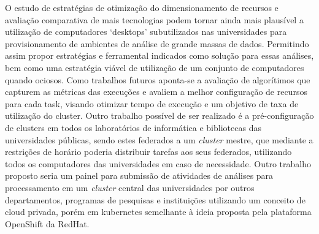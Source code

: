 O estudo de estratégias de otimização do dimensionamento de recursos e avaliação comparativa de mais tecnologias podem tornar ainda mais plausível a utilização de computadores ‘desktops’ subutilizados nas universidades para provisionamento de ambientes de análise de grande massas de dados. Permitindo assim propor estratégias e ferramental indicados como solução para essas análises, bem como uma estratégia viável de utilização de um conjunto de computadores quando ociosos. Como trabalhos futuros aponta-se a avaliação de algorítimos que capturem as métricas das execuções e avaliem a melhor configuração de recursos para cada task, visando otimizar tempo de execução e um objetivo de taxa de utilização do cluster. Outro trabalho possível de ser realizado é a pré-configuração de clusters em todos os laboratórios de informática e bibliotecas das universidades públicas, sendo estes federados a um \emph{cluster} mestre, que mediante a restrições de horário poderia distribuir tarefas aos seus federados, utilizando todos os computadores das universidades em caso de necessidade. Outro trabalho proposto seria um painel para submissão de atividades de análises para processamento em um \emph{cluster} central das universidades por outros departamentos, programas de pesquisas e instituições utilizando um conceito de cloud privada, porém em kubernetes semelhante à ideia proposta pela plataforma OpenShift da RedHat.


